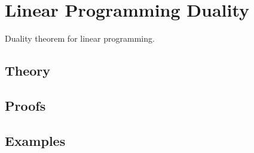 
\section{Linear Programming Duality}
\label{sec:2.4.08-lp-duality}

\begin{ticket}
Duality theorem for linear programming.
\end{ticket}

\subsection*{Theory}

\subsection*{Proofs}

\subsection*{Examples}
